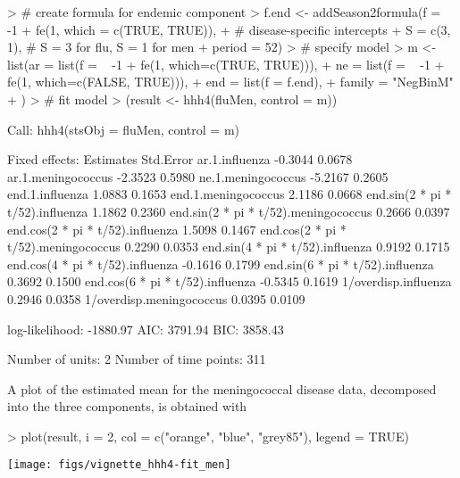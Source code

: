 \documentclass[a4paper,11pt]{article}
\begin{document}
\begin{Schunk}
\begin{Sinput}
> # create formula for endemic component
> f.end <- addSeason2formula(f = ~ -1 + fe(1, which = c(TRUE, TRUE)), 
+                                            # disease-specific intercepts
+                            S = c(3, 1),    # S = 3 for flu, S = 1 for men
+                            period = 52)
> # specify model
> m <- list(ar = list(f = ~ -1 + fe(1, which=c(TRUE, TRUE))), 
+           ne = list(f = ~ -1 + fe(1, which=c(FALSE, TRUE))), 
+           end = list(f = f.end),
+           family = "NegBinM"
+           )
> # fit model
> (result <- hhh4(fluMen, control = m))
\end{Sinput}
\begin{Soutput}
Call: 
hhh4(stsObj = fluMen, control = m)


Fixed effects: 
                                      Estimates  Std.Error
ar.1.influenza                          -0.3044     0.0678
ar.1.meningococcus                      -2.3523     0.5980
ne.1.meningococcus                      -5.2167     0.2605
end.1.influenza                          1.0883     0.1653
end.1.meningococcus                      2.1186     0.0668
end.sin(2 * pi * t/52).influenza         1.1862     0.2360
end.sin(2 * pi * t/52).meningococcus     0.2666     0.0397
end.cos(2 * pi * t/52).influenza         1.5098     0.1467
end.cos(2 * pi * t/52).meningococcus     0.2290     0.0353
end.sin(4 * pi * t/52).influenza         0.9192     0.1715
end.cos(4 * pi * t/52).influenza        -0.1616     0.1799
end.sin(6 * pi * t/52).influenza         0.3692     0.1500
end.cos(6 * pi * t/52).influenza        -0.5345     0.1619
1/overdisp.influenza                     0.2946     0.0358
1/overdisp.meningococcus                 0.0395     0.0109

log-likelihood:    -1880.97 
AIC:               3791.94 
BIC:               3858.43 

Number of units:          2 
Number of time points:    311 
\end{Soutput}
\end{Schunk}
A plot of the estimated mean for the meningococcal disease data, 
decomposed into the three components, is obtained with
\begin{center}
\begin{Schunk}
\begin{Sinput}
> plot(result, i = 2, col = c("orange", "blue", "grey85"), legend = TRUE)
\end{Sinput}
\end{Schunk}
\texttt{[image: figs/vignette\_hhh4-fit\_men]}
\end{center}
\end{document}
